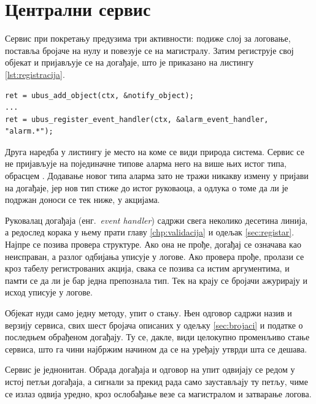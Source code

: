 \documentclass[12pt,oneside]{memoir}
\begin{document}
\section{Централни сервис}
\label{sec:impl-notifyd}

Сервис  при покретању предузима три активности: подиже слој за логовање,
поставља бројаче на нулу и повезује се на магистралу. Затим региструје свој објекат и
пријављује се на догађаје, што је приказано на листингу \ref{lst:registracija}.

\begin{lstlisting}[caption={Регистрација објекта и пријава на конкретну фамилију догађаја},label={lst:registracija}]
ret = ubus_add_object(ctx, &notify_object);
...
ret = ubus_register_event_handler(ctx, &alarm_event_handler, "alarm.*");
\end{lstlisting}

Друга наредба у листингу је место на коме се види природа система. Сервис се не пријављује на
појединачне типове аларма него на више њих истог типа, обрасцем . Додавање новог
типа аларма зато не тражи никакву измену у пријави на догађаје, јер нов тип стиже до истог
руковаоца, а одлука о томе да ли је подржан доноси се тек ниже, у акцијама.

Руковалац догађаја (енг.\ \textit{event handler}) садржи свега неколико десетина линија, а
редослед корака у њему прати главу \ref{chp:validacija} и одељак \ref{sec:registar}. Најпре се позива провера структуре. Ако она не прође, догађај се
означава као неисправан, а разлог одбијања уписује у логове. Ако провера прође, пролази се
кроз табелу регистрованих акција, свака се позива са истим аргументима, и памти се да ли је
бар једна препознала тип. Тек на крају се бројачи ажурирају и исход уписује у логове.

Објекат  нуди само једну методу, упит о стању. Њен одговор садржи
назив и верзију сервиса, свих шест бројача описаних у одељку \ref{sec:brojaci} и податке о
последњем обрађеном догађају.
Ту се, дакле, види целокупно променљиво стање сервиса, што га чини најбржим начином да се на
уређају утврди шта се дешава.

Сервис је једнонитан. Обрада догађаја и одговор на упит одвијају се редом у истој петљи
догађаја, а сигнали за прекид рада само заустављају ту петљу, чиме се излаз одвија уредно,
кроз ослобађање везе са магистралом и затварање логова.
\end{document}
